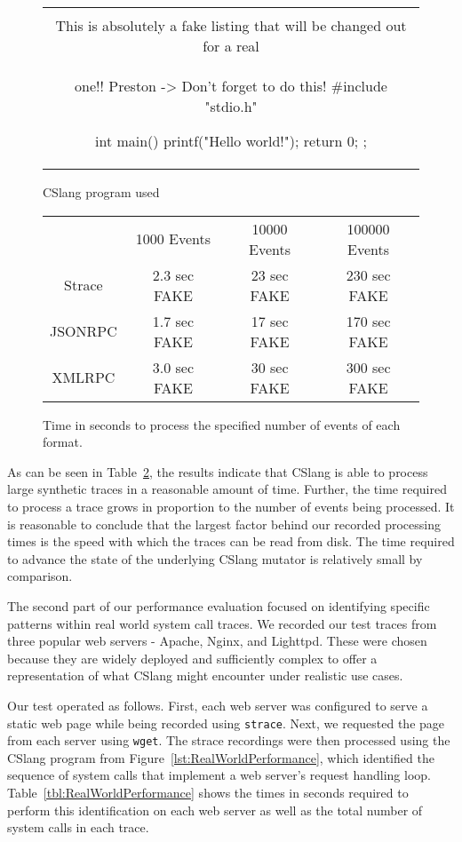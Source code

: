 \begin{figure}[H]
\centering
\begin{tabular}{c}
\begin{lstlisting}
\\ This is absolutely a fake listing that will be changed out for a real
\\ one!!  Preston -> Don't forget to do this!
#include "stdio.h"

int main() {
    printf("Hello world!\n");
    return 0;
};
\end{lstlisting}
\end{tabular}
\caption{CSlang program used }
\label{lst:SyntheticPerformance}
\end{figure}


\begin{figure}
  \begin{tabular}{|c|c|c|c|}
                & 1000 Events   & 10000 Events & 100000 Events \\
  Strace        & 2.3 sec FAKE  & 23 sec FAKE  & 230 sec FAKE  \\
  JSONRPC       & 1.7 sec FAKE  & 17 sec FAKE  & 170 sec FAKE  \\
  XMLRPC        & 3.0 sec FAKE  & 30 sec FAKE  & 300 sec FAKE  \\
\end{tabular}
\caption{Time in seconds to process the specified number of events of each
  format.}
\label{tbl:SyntheticPerformance}
\end{figure}

As can be seen in Table~\ref{tbl:SyntheticPerformance},
the results indicate that CSlang is able to
process large synthetic traces in a reasonable amount of time.  Further,
the time required to process a trace grows in proportion to the number of
events being processed.
It is reasonable to conclude that the largest
factor behind our recorded processing times is the speed with which the
traces can be read from disk.  The time required to advance the state of
the underlying CSlang mutator is relatively small by comparison.

The second part of our performance evaluation
focused on identifying specific
patterns within real world system call traces.  We recorded our test traces
from three popular web servers - Apache, Nginx, and Lighttpd. These
were chosen because they are widely deployed and sufficiently
complex to offer a representation of what CSlang might encounter under
realistic use cases.

Our test operated as follows.  First, each web server was configured to
serve a static web page while being recorded using {\tt strace}.  Next, we
requested the page from each server using {\tt wget}.  The strace
recordings were then processed using the CSlang program from
Figure~\ref{lst:RealWorldPerformance},  which
identified the sequence of system calls that implement
a web server's request handling
loop.  Table~\ref{tbl:RealWorldPerformance}
shows the times in seconds required to perform this identification on each
web server as well as the total number of system calls in each trace.


